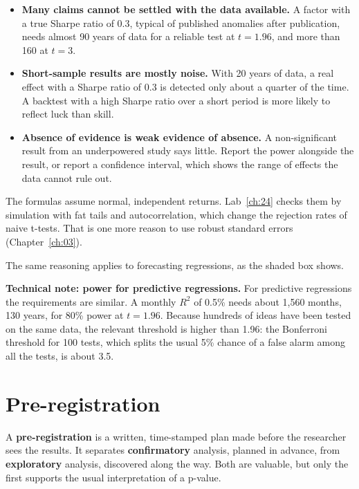 \begin{itemize}
  \item \textbf{Many claims cannot be settled with the data available.} A factor with a true Sharpe ratio of 0.3, typical of published anomalies after publication, needs almost 90 years of data for a reliable test at $t = 1.96$, and more than 160 at $t = 3$.
  \item \textbf{Short-sample results are mostly noise.} With 20 years of data, a real effect with a Sharpe ratio of 0.3 is detected only about a quarter of the time. A backtest with a high Sharpe ratio over a short period is more likely to reflect luck than skill.
  \item \textbf{Absence of evidence is weak evidence of absence.} A non-significant result from an underpowered study says little. Report the power alongside the result, or report a confidence interval, which shows the range of effects the data cannot rule out.
\end{itemize}

The formulas assume normal, independent returns. Lab~\ref{ch:24} checks them by simulation with fat tails and autocorrelation, which change the rejection rates of naive t-tests. That is one more reason to use robust standard errors (Chapter~\ref{ch:03}).

The same reasoning applies to forecasting regressions, as the shaded box shows.

\begin{technote}
\textbf{Technical note: power for predictive regressions.} For predictive regressions the requirements are similar. A monthly $R^2$ of 0.5\% needs about 1,560 months, 130 years, for 80\% power at $t = 1.96$. Because hundreds of ideas have been tested on the same data, the relevant threshold is higher than 1.96: the Bonferroni threshold for 100 tests, which splits the usual 5\% chance of a false alarm among all the tests, is about 3.5.
\end{technote}

\section{Pre-registration}
\label{sec:24-prereg}

A \textbf{pre-registration} is a written, time-stamped plan made before the researcher sees the results. It separates \textbf{confirmatory} analysis, planned in advance, from \textbf{exploratory} analysis, discovered along the way. Both are valuable, but only the first supports the usual interpretation of a p-value.

